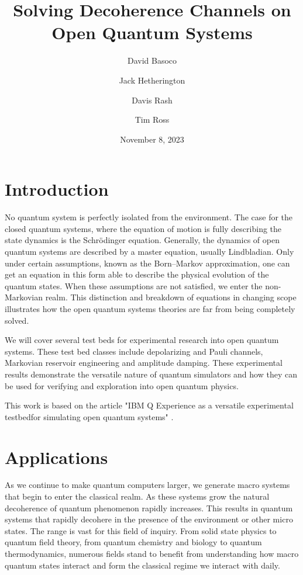 \documentclass[12pt]{article}
\title{Solving Decoherence Channels on Open Quantum Systems}
\author{David Basoco \and Jack Hetherington \and Davis Rash \and Tim Ross}
\date{November 8, 2023}
\begin{document}
  \maketitle


  \section{Introduction}

  No quantum system is perfectly isolated from the environment. The case for the closed quantum systems, where the equation of motion is fully describing the state dynamics is the Schr\"{o}dinger equation. Generally, the dynamics of open quantum systems are described by a master equation, usually Lindbladian. Only under certain assumptions, known as the Born--Markov approximation, one can get an equation in this form able to describe the physical evolution of the quantum states. When these assumptions are not satisfied, we enter the non-Markovian realm. This distinction and breakdown of equations in changing scope illustrates how the open quantum systems theories are far from being completely solved.

  We will cover several test beds for experimental research into open quantum systems. These test bed classes include depolarizing and Pauli channels, Markovian reservoir engineering and amplitude damping. These experimental results demonstrate the versatile nature of quantum simulators and how they can be used for verifying and exploration into open quantum physics.

  This work is based on the article "IBM Q Experience as a versatile experimental testbedfor simulating open quantum systems" \cite{openQuantumSystems}.


  \section{Applications}

  As we continue to make quantum computers larger, we generate macro systems that begin to enter the classical realm. As these systems grow the natural decoherence of quantum phenomenon rapidly increases. This results in quantum systems that rapidly decohere in the presence of the environment or other micro states. The range is vast for this field of inquiry. From solid state physics to quantum field theory, from quantum chemistry and biology to quantum thermodynamics, numerous fields stand to benefit from understanding how macro quantum states interact and form the classical regime we interact with daily.
\end{document}
